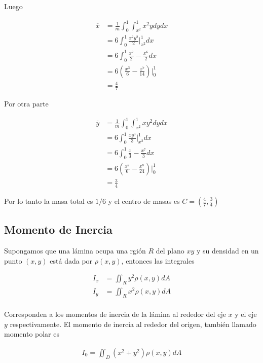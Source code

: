 \documentclass{article}
\theoremstyle{plain}
\theoremstyle{definition}
\begin{document}
Luego

\begin{align*}
    \overline{x} &= \frac{1}{m} \int_{0}^1\int_{x^2}^1 x^2y dydx \\
        &= 6 \int_{0}^1 \frac{x^2y^2}{2}\bigg|_{x^2}^1 dx \\
        &= 6 \int_{0}^1 \frac{x^2}{2}-\frac{x^6}{2} dx \\
        &= 6 \left( \frac{x^3}{6}-\frac{x^7}{14} \right)\bigg|_0^1\\
        &=\frac{4}{7}
\end{align*}

Por otra parte

\begin{align*}
    \overline{y} &= \frac{1}{m} \int_{0}^1\int_{x^2}^1 xy^2 dydx \\
        &= 6 \int_{0}^1 \frac{xy^3}{3}\bigg|_{x^2}^1 dx \\
        &= 6 \int_{0}^1 \frac{x}{3}-\frac{x^7}{3} dx \\
        &= 6 \left( \frac{x^2}{6}-\frac{x^8}{24} \right)\bigg|_0^1\\
        &=\frac{3}{4}
\end{align*}

Por lo tanto la masa total es $1/6$ y el centro de masas es $C=\displaystyle \left( \frac{4}{7},\frac{3}{4}\right)$




\newpage


\subsection{Momento de Inercia}

Supongamos que una l\'amina ocupa una rgi\'on $R$ del plano $xy$ y su densidad en un punto $(x,y)$ est\'a dada por $\rho(x,y)$, entonces las integrales


\begin{align*}
    I_x &= \iint_R y^2\rho(x,y) dA \\
    I_y &= \iint_R x^2\rho(x,y) dA \\
\end{align*}

Corresponden a los momentos de inercia de la l\'amina al rededor del eje $x$ y el eje $y$ respectivamente. El momento de inercia al rededor del origen, tambi\'en llamado momento polar es

\begin{align*}
I_0 =\iint_D (x^2+y^2)\rho(x,y)dA
\end{align*}
\end{document}
